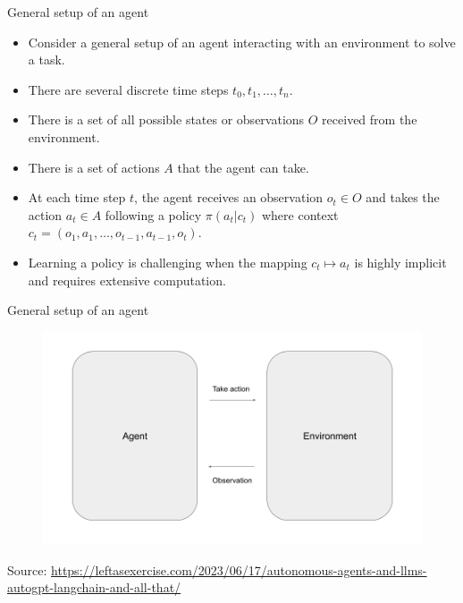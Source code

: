 \documentclass[handout]{beamer}
\begin{document}
\begin{frame}{General setup of an agent}
\scriptsize
    \begin{itemize}
    \item Consider a general setup of an agent interacting with an environment to solve a task.
        \item There are several discrete time steps $t_0,t_1,\dots,t_n$.
        \item There is a set of all possible states or observations $O$ received from the environment.
        \item There is a set of actions $A$ that the agent can take.    
        \item At each time step $t$, the agent receives an observation $o_t \in O$ and  takes the action $a_t \in A$ following a policy $\pi(a_t | c_t)$ where context $c_t = (o_1, a_1, \ldots, o_{t-1}, a_{t-1}, o_t)$.
        \item Learning a policy is challenging when the mapping  $c_t \mapsto a_t$ is highly implicit and requires extensive computation.
    \end{itemize}
\end{frame}

\begin{frame}{General setup of an agent}
\scriptsize
      \begin{figure}[h]
	\includegraphics[scale = 0.3]{pics/autonomousagent.png}
\end{figure}
Source: \url{https://leftasexercise.com/2023/06/17/autonomous-agents-and-llms-autogpt-langchain-and-all-that/}
\end{frame}
\end{document}
